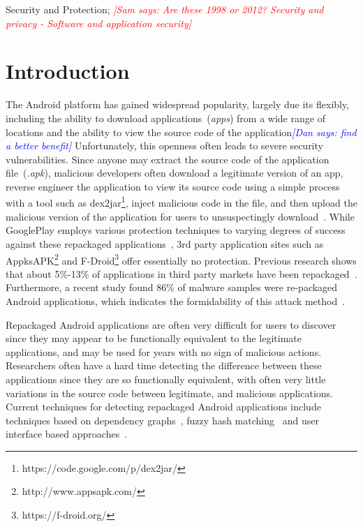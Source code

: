 \documentclass{sig-alternate}
\newcommand{\sam}[1]{\textcolor{red}{{\it [Sam says: #1]}}}
\newcommand{\dan}[1]{\textcolor{blue}{{\it [Dan says: #1]}}}
\begin{document}
Security and Protection;
\sam{Are these 1998 or 2012? Security and privacy - Software and application security}






\section{Introduction}


%


The Android platform has gained widespread popularity, largely due its flexibly, including the ability to download applications~(\emph{apps}) from a wide range of locations and the ability to view the source code of the application\dan{find a better benefit} Unfortunately, this openness often leads to severe security vulnerabilities. Since anyone may extract the source code of the application file~(\emph{.apk}), malicious developers often download a legitimate version of an app, reverse engineer the application to view its source code using a simple process with a tool such as dex2jar\footnote{https://code.google.com/p/dex2jar/}, inject malicious code in the file, and then upload the malicious version of the application for users to unsuspectingly download~\cite{Gibler_adrob:examining}. While GooglePlay employs various protection techniques to varying degrees of success against these repackaged applications~\cite{bouncer_url1}, 3rd party application sites such as AppksAPK\footnote{http://www.appsapk.com/} and F-Droid\footnote{https://f-droid.org/} offer essentially no protection. Previous research shows that about 5\%-13\% of applications in third party markets have been repackaged~\cite{Zhou:2012:DRS:2133601.2133640}. Furthermore, a recent study found 86\% of malware samples were re-packaged Android applications, which indicates the formidability of this attack method~\cite{Zhou:2012:DAM:2310656.2310710}.

Repackaged Android applications are often very difficult for users to discover since they may appear to be functionally equivalent to the legitimate applications, and may be used for years with no sign of malicious actions. Researchers often have a hard time detecting the difference between these applications since they are so functionally equivalent, with often very little variations in the source code between legitimate, and malicious applications. Current techniques for detecting repackaged Android applications include techniques based on dependency graphs~\cite{Chen:2014:AAS:2568225.2568286}, fuzzy hash matching~\cite{Zhou:2012:DRS:2133601.2133640} and user interface based approaches~\cite{Zhang:2014:VTO:2627393.2627395}.
\end{document}
